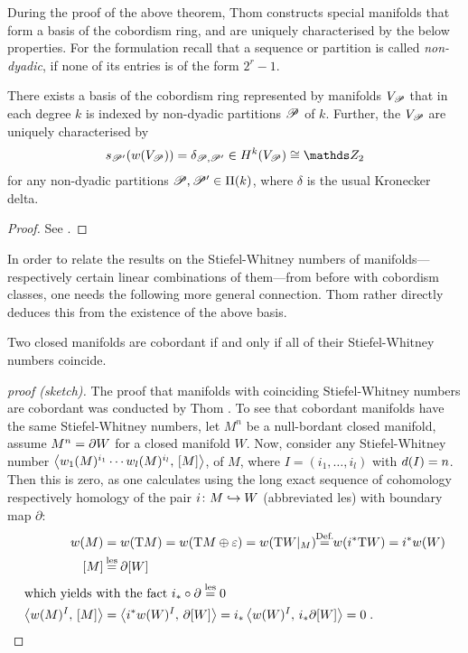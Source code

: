 During the proof of the above theorem, Thom constructs special
manifolds that form a basis of the cobordism ring,
and are uniquely characterised by the below properties.
For the formulation recall that a sequence or partition is called
\emph{non-dyadic}, if none of its entries is of the form $2^r-1$.
\begin{Thm}\label{thm:basiscobordismring}
  There exists a basis of the cobordism ring represented by manifolds
  $V_{\mathscr{P}}$ that in each degree $k$ is indexed by non-dyadic
  partitions $\mathscr{P}$ of $k$. Further, the $V_{\mathscr{P}}$ are uniquely
  characterised by
  \begin{gather*}
    \s{\Part'}(\W{V_\Part}) = \delta_{\Part,\Part'}
    \in \H^k(V_{\Part})\cong \Zmod2
  \end{gather*}
  for any non-dyadic partitions $\mathscr{P},\mathscr{P}'\in\Pi({k})$,
  where $\delta$ is the usual Kronecker delta.
  \begin{proof}
    See \cite[Section~IV.5, proof of Theorem~IV.9]{thom}.
  \end{proof}
\end{Thm}

In order to relate the results on the Stiefel-Whitney numbers of
manifolds---respectively certain linear combinations of them---from
before with cobordism classes, one needs the following more general
connection. Thom rather directly deduces this from the existence of
the above basis.
\begin{Thm}[Thom]\label{thm:cobordantiffswnumscoincide}
  Two closed manifolds are cobordant if and only if all of their
  Stiefel-Whitney numbers coincide.
  \begin{proof}[proof (sketch)]
    The proof that manifolds with coinciding Stiefel-Whitney numbers
    are cobordant was conducted by Thom \cite[Theorem IV.10]{thom}.
    To see that cobordant manifolds have the same Stiefel-Whitney
    numbers, let $M^n$ be a null-bordant closed manifold, \idest
    assume $M^n=\partial{W}$ for a closed manifold $W$. Now, consider
    any Stiefel-Whitney number 
    $\left\langle {w_{1}}(M)^{i_1}\dotsm{w_{l}}(M)^{i_l},\, [M] \right\rangle$,
    of $M$, where $I=(i_1,\dotsc,i_l)$ with $d(I)=n$.
    Then this is zero, as one calculates using the long
    exact sequence of cohomology respectively homology of the pair
    $i\colon M\hookrightarrow W$ (abbreviated les) with boundary map
    $\partial$:
    \begin{align*}
      \W{M}
      &= \W{\T M}
        = \W{\T M\oplus\trivbdl}
        = \W{\T W|_{M}}
        \cequalsby{Def.} \W{\pb i \T W} = \pb i \W{W} \\
      \fundcl M
      &\cequalsby{les} \partial \fundcl{W} \\
      \intertext{which yields with the fact
      $\pf i\circ\partial\overset{\text{les}}= 0$}
      \capped{\W{M}^I}{\fundcl M}
      &= \capped{\pb i\W{W}^I}{\partial\fundcl{W}}
        = \pf i\capped{\W{W}^I}{\pf i\partial \fundcl{W}}
        = 0
        \;.
        \qedhere
    \end{align*}
  \end{proof}
\end{Thm}

